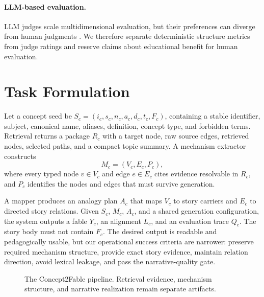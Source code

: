 \documentclass[letterpaper]{article} %
\begin{document}
\paragraph{LLM-based evaluation.}
LLM judges scale multidimensional evaluation, but their preferences can diverge from human judgments \citep{zheng2023judging}. We therefore separate deterministic structure metrics from judge ratings and reserve claims about educational benefit for human evaluation.

\section{Task Formulation}

Let a concept seed be $S_c=(i_c,s_c,n_c,a_c,d_c,t_c,F_c)$, containing a stable identifier, subject, canonical name, aliases, definition, concept type, and forbidden terms. Retrieval returns a package $R_c$ with a target node, raw source edges, retrieved nodes, selected paths, and a compact topic summary. A mechanism extractor constructs
\[
M_c=(V_c,E_c,P_c),
\]
where every typed node $v\in V_c$ and edge $e\in E_c$ cites evidence resolvable in $R_c$, and $P_c$ identifies the nodes and edges that must survive generation.

A mapper produces an analogy plan $A_c$ that maps $V_c$ to story carriers and $E_c$ to directed story relations. Given $S_c$, $M_c$, $A_c$, and a shared generation configuration, the system outputs a fable $Y_c$, an alignment $L_c$, and an evaluation trace $Q_c$. The story body must not contain $F_c$. The desired output is readable and pedagogically usable, but our operational success criteria are narrower: preserve required mechanism structure, provide exact story evidence, maintain relation direction, avoid lexical leakage, and pass the narrative-quality gate.

\begin{figure}[t]
\centering
{}
\caption{The Concept2Fable pipeline. Retrieval evidence, mechanism structure, and narrative realization remain separate artifacts.}
\label{fig:pipeline}
\end{figure}
\end{document}
